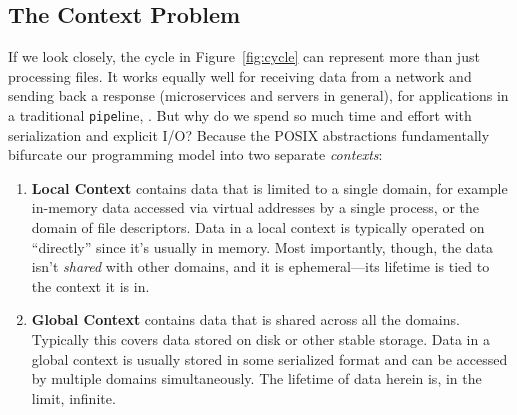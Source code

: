 \subsection{The Context Problem}

If we look closely, the cycle in Figure~\ref{fig:cycle} can represent more than just processing files. It works
equally well for receiving data from a network and sending back a response (microservices and servers in general), for
applications in a traditional \texttt{pipe}line, \etc{}. But why do we spend so much time and effort with serialization and explicit I/O? Because the POSIX abstractions
fundamentally bifurcate our programming model into two separate \emph{contexts}:

\begin{enumerate}
    \item \textbf{Local Context} contains data that is limited to a single domain, for example in-memory data accessed
          via virtual addresses by a single process, or the domain of file descriptors. Data in a local context is typically
          operated on ``directly'' since it's usually in memory. Most importantly, though, the data isn't \emph{shared} with
          other domains, and it is ephemeral---its lifetime is tied to the context it is in.
    \item \textbf{Global Context} contains data that is shared across all the domains. Typically this covers data stored
          on disk or other stable storage. Data in a global context is usually stored in some serialized format and can
          be accessed by multiple domains simultaneously. The lifetime of data herein is, in the limit,
          infinite.
\end{enumerate}

